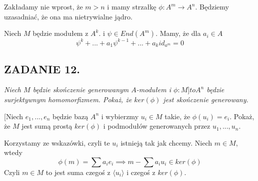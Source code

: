 \documentclass{article}
\begin{document}
Zakładamy nie wprost, że $m>n$ i mamy strzałkę $\phi:A^m\to A^n$. Będziemy uzasadniać, że ona ma nietrywialne jądro.

\begin{center}
\end{center}
Niech $M$ będzie modułem z $A^k$.
i $\psi\in End(A^m)$. Mamy, że dla $a_i\in A$
$$\psi^k+...+a_1\psi^{k-1}+...+a_kid_{a^m}=0$$

\begin{center}\end{center}

\subsection*{ZADANIE 12.}
{\slshape\color{blue}Niech $M$ będzie skończenie generowanym $A$-modułem i $\phi:M]to A^n$ będzie surjektywnym homomorfizmem. Pokaż, że $ker(\phi)$ jest skończenie generowany.

[Niech $e_1,...,e_n$ będzie bazą $A^n$ i wybierzmy $u_i\in M$ takie, że $\phi(u_i)=e_i$. Pokaż, że $M$ jest sumą prostą $ker(\phi)$ i podmodułów generowanych przez $u_1,...,u_n$.}

%
%

Korzystamy ze wskazówki, czyli te $u_i$ istnieją tak jak chcemy. Niech $m\in M$, wtedy
$$\phi(m)=\sum a_ie_i\implies m-\sum a_iu_i\in ker(\phi)$$
Czyli $m\in M$ to jest suma czegoś z $\langle u_i\rangle$ i czegoś z $ker(\phi)$.
\end{document}
